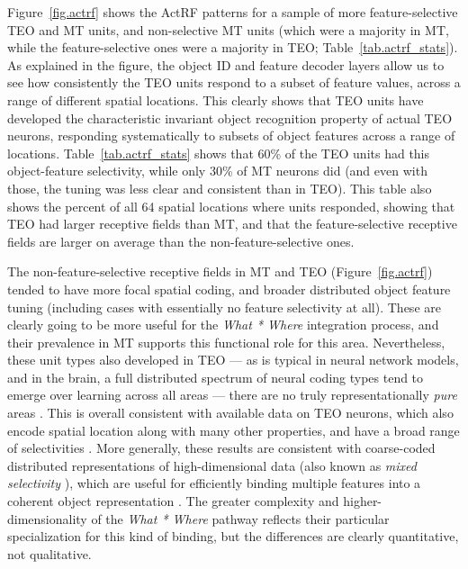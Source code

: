 \documentclass[11pt,twoside]{article}
\newif\myifpdf
\begin{document}
Figure~\ref{fig.actrf} shows the ActRF patterns for a sample of more feature-selective TEO and MT units, and non-selective MT units (which were a majority in MT, while the feature-selective ones were a majority in TEO; Table~\ref{tab.actrf_stats}).  As explained in the figure, the object ID and feature decoder layers allow us to see how consistently the TEO units respond to a subset of feature values, across a range of different spatial locations.  This clearly shows that TEO units have developed the characteristic invariant object recognition property of actual TEO neurons, responding systematically to subsets of object features across a range of locations.  Table~\ref{tab.actrf_stats} shows that 60\% of the TEO units had this object-feature selectivity, while only 30\% of MT neurons did (and even with those, the tuning was less clear and consistent than in TEO).  This table also shows the percent of all 64 spatial locations where units responded, showing that TEO had larger receptive fields than MT, and that the feature-selective receptive fields are larger on average than the non-feature-selective ones.

The non-feature-selective receptive fields in MT and TEO (Figure~\ref{fig.actrf}) tended to have more focal spatial coding, and broader distributed object feature tuning (including cases with essentially no feature selectivity at all).  These are clearly going to be more useful for the {\em What * Where} integration process, and their prevalence in MT supports this functional role for this area.  Nevertheless, these unit types also developed in TEO --- as is typical in neural network models, and in the brain, a full distributed spectrum of neural coding types tend to emerge over learning across all areas --- there are no truly representationally {\em pure} areas \cite{BehrmannPlaut13}.  This is overall consistent with available data on TEO neurons, which also encode spatial location along with many other properties, and have a broad range of selectivities \cite[e.g.,]{HongYaminsMajajEtAl16,MajajHongSolomonEtAl15,ZoccolanKouhPoggioEtAl07,Tanaka96,LogothetisSheinberg96}.  More generally, these results are consistent with coarse-coded distributed representations of high-dimensional data (also known as {\em mixed selectivity} ), which are useful for efficiently binding multiple features into a coherent object representation \cite{HintonMcClellandRumelhart86,OReillyBusby02,OReillyBusbySoto03,CerOReilly06}.  The greater complexity and higher-dimensionality of the {\em What * Where} pathway reflects their particular specialization for this kind of binding, but the differences are clearly quantitative, not qualitative.
\end{document}

